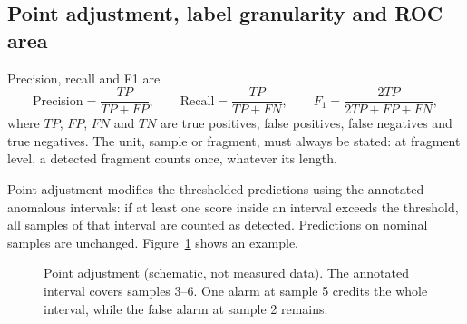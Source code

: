 \subsection{Point adjustment, label granularity and ROC area}
\label{sec:datasets-point-adjustment}

Precision, recall and F1 are
\begin{equation}
  \mathrm{Precision}=\frac{TP}{TP+FP},\qquad
  \mathrm{Recall}=\frac{TP}{TP+FN},\qquad
  F_1=\frac{2TP}{2TP+FP+FN},
  \label{eq:datasets-classification-metrics}
\end{equation}
where \(TP\), \(FP\), \(FN\) and \(TN\) are true positives, false positives,
false negatives and true negatives. The unit, sample or fragment, must
always be stated: at fragment level, a detected fragment counts once,
whatever its length.

Point adjustment modifies the thresholded predictions using the annotated
anomalous intervals: if at least one score inside an interval exceeds the
threshold, all samples of that interval are counted as detected. Predictions
on nominal samples are unchanged. Figure~\ref{fig:datasets-pa} shows an
example.

\begin{figure}[htbp]
  \centering
  \caption{Point adjustment (schematic, not measured data). The annotated
  interval covers samples \num{3}--\num{6}. One alarm at sample \num{5}
  credits the whole interval, while the false alarm at sample \num{2}
  remains.}
  \label{fig:datasets-pa}
\end{figure}

